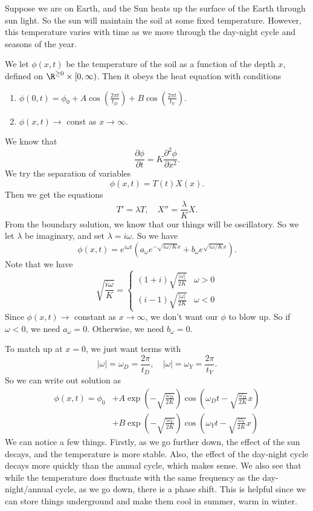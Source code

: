 \documentclass[a4paper]{article}
\begin{document}
\begin{eg}
  Suppose we are on Earth, and the Sun heats up the surface of the Earth through sun light. So the sun will maintain the soil at some fixed temperature. However, this temperature varies with time as we move through the day-night cycle and seasons of the year.

  We let $\phi(x, t)$ be the temperature of the soil as a function of the depth $x$, defined on $\R^{\geq 0} \times [0, \infty)$. Then it obeys the heat equation with conditions
  \begin{enumerate}
    \item $\phi(0, t) = \phi_0 + A \cos \left(\frac{2\pi t}{t_D}\right) + B\cos \left(\frac{2\pi t}{t_Y}\right)$.
    \item $\phi(x, t) \to $ const as $x \to \infty$.
  \end{enumerate}
  We know that
  \[
    \frac{\partial \phi}{\partial t} = K \frac{\partial^2 \phi}{\partial x^2}.
  \]
  We try the separation of variables
  \[
    \phi(x, t) = T(t) X(x).
  \]
  Then we get the equations
  \[
    T' = \lambda T,\quad X'' = \frac{\lambda}{K}X.
  \]
  From the boundary solution, we know that our things will be oscillatory. So we let $\lambda$ be imaginary, and set $\lambda = i \omega$. So we have
  \[
    \phi(x, t) = e^{i\omega t}\left(a_\omega e^{-\sqrt{i\omega/K}x} + b_\omega e^{\sqrt{i\omega/K}x}\right).
  \]
  Note that we have
  \[
    \sqrt{\frac{i\omega}{K}} =
    \begin{cases}
      (1 + i) \sqrt{\frac{|\omega|}{2K}} & \omega > 0\\
      (i - 1) \sqrt{\frac{|\omega|}{2K}} & \omega < 0
    \end{cases}
  \]
  Since $\phi(x, t) \to $ constant as $x \to \infty$, we don't want our $\phi$ to blow up. So if $\omega < 0$, we need $a_\omega = 0$. Otherwise, we need $b_\omega = 0$.

  To match up at $x = 0$, we just want terms with
  \[
    |\omega| = \omega_D = \frac{2\pi}{t_D},\quad |\omega| = \omega_Y = \frac{2\pi}{t_Y}.
  \]
  So we can write out solution as
  \begin{align*}
    \phi(x, t) = \phi_0 &+ A \exp\left(-\sqrt{\frac{\omega_D}{2K}}\right)\cos\left(\omega_Dt - \sqrt{\frac{\omega_D}{2K}}x\right) \\
    &+ B \exp\left(-\sqrt{\frac{\omega_Y}{2K}}\right)\cos\left(\omega_Yt - \sqrt{\frac{\omega_Y}{2K}}x\right)
  \end{align*}
  We can notice a few things. Firstly, as we go further down, the effect of the sun decays, and the temperature is more stable. Also, the effect of the day-night cycle decays more quickly than the annual cycle, which makes sense. We also see that while the temperature does fluctuate with the same frequency as the day-night/annual cycle, as we go down, there is a phase shift. This is helpful since we can store things underground and make them cool in summer, warm in winter.
\end{eg}
\end{document}
